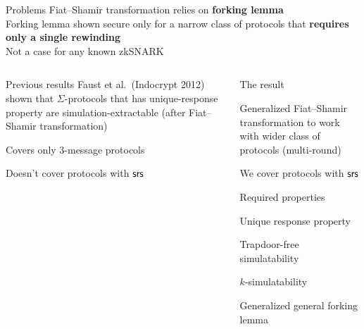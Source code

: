 \documentclass[aspectratio=169]{beamer}
\renewcommand{\emph}[1]{\textbf{#1}}
\begin{document}
\begin{frame}
  \begin{block}{Problems}
    Fiat--Shamir transformation relies on \emph{forking lemma}\\
    Forking lemma shown secure only for a narrow class of protocols that
    \emph{requires only a single rewinding}\\
    Not a case for any known zkSNARK
  \end{block}
  \pause
  \begin{columns}[t]
    \begin{column}{0.5\linewidth}
      \begin{block}{Previous results}
        Faust et al.~(Indocrypt 2012) shown that $\Sigma$-protocols that has
        unique-response property are simulation-extractable (after Fiat--Shamir
        transformation)
        \begin{compactitem}
        \item Covers only $3$-message protocols
        \item Doesn't cover protocols with $\mathsf{srs}$
        \end{compactitem}
      \end{block}
      \pause
    \end{column}
    \begin{column}{0.4\linewidth}
      \begin{block}{The result}
        \begin{compactitem}
        \item Generalized Fiat--Shamir transformation to work with wider class
          of protocols (multi-round)
        \item We cover protocols with $\mathsf{srs}$
        \end{compactitem}
      \end{block}\pause
      \begin{block}{Required properties}
        \begin{compactitem}
          \item Unique response property
          \item Trapdoor-free simulatability
          \item $k$-simulatability
          \item Generalized general forking lemma
          \end{compactitem}
        \end{block}
    \end{column}
  \end{columns}
\end{frame}
\end{document}
